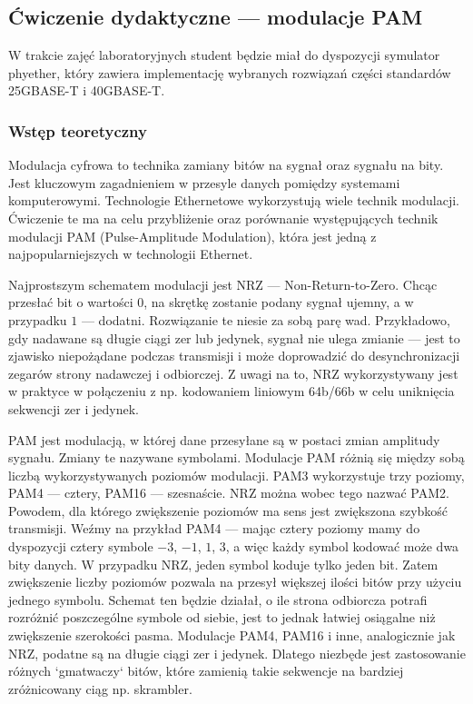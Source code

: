 \subsection{Ćwiczenie dydaktyczne --- modulacje PAM}

W trakcie zajęć laboratoryjnych student będzie miał do dyspozycji symulator phyether, który zawiera implementację wybranych rozwiązań
części standardów 25GBASE-T i 40GBASE-T.

\subsubsection{Wstęp teoretyczny}

Modulacja cyfrowa to technika zamiany bitów na sygnał oraz sygnału na bity. Jest kluczowym zagadnieniem w przesyle danych pomiędzy systemami
komputerowymi. Technologie Ethernetowe wykorzystują wiele technik modulacji. Ćwiczenie te ma na celu przybliżenie oraz porównanie
występujących technik modulacji PAM (Pulse-Amplitude Modulation), która jest jedną z najpopularniejszych w technologii Ethernet.

Najprostszym schematem modulacji jest NRZ --- Non-Return-to-Zero. Chcąc przesłać bit o wartości $0$, na skrętkę zostanie podany sygnał
ujemny, a w przypadku $1$ --- dodatni. Rozwiązanie te niesie za sobą parę wad. Przykładowo, gdy nadawane są długie ciągi zer lub jedynek, sygnał
nie ulega zmianie --- jest to zjawisko niepożądane podczas transmisji i może doprowadzić do desynchronizacji zegarów strony nadawczej i odbiorczej.
Z uwagi na to, NRZ wykorzystywany jest w praktyce w połączeniu z np. kodowaniem liniowym 64b/66b w celu uniknięcia sekwencji zer i jedynek.

PAM jest modulacją, w której dane przesyłane są w postaci zmian amplitudy sygnału. Zmiany te nazywane symbolami. Modulacje PAM różnią się między sobą
liczbą wykorzystywanych poziomów modulacji. PAM3 wykorzystuje trzy poziomy, PAM4 --- cztery, PAM16 --- szesnaście. NRZ można wobec tego nazwać PAM2.
Powodem, dla którego zwiększenie poziomów ma sens jest zwiększona szybkość transmisji. Weźmy na przykład PAM4 --- mając cztery poziomy mamy
do dyspozycji cztery symbole $-3$, $-1$, $1$, $3$, a więc każdy symbol kodować może dwa bity danych. W przypadku NRZ, jeden symbol koduje tylko jeden bit.
Zatem zwiększenie liczby poziomów pozwala na przesył większej ilości bitów przy użyciu jednego symbolu. Schemat ten będzie działał, o ile strona odbiorcza
potrafi rozróżnić poszczególne symbole od siebie, jest to jednak łatwiej osiągalne niż zwiększenie szerokości pasma.
Modulacje PAM4, PAM16 i inne, analogicznie jak NRZ, podatne są na długie ciągi zer i jedynek. Dlatego niezbęde jest zastosowanie różnych `gmatwaczy` bitów, które
zamienią takie sekwencje na bardziej zróżnicowany ciąg np. skrambler.

